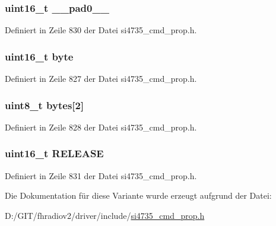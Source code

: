 \subsubsection[{\+\_\+\+\_\+pad0\+\_\+\+\_\+}]{\setlength{\rightskip}{0pt plus 5cm}uint16\+\_\+t \+\_\+\+\_\+pad0\+\_\+\+\_\+}\label{unionfm__agc__rel__rate_a77132c2c26a75f5b8751b235cda23828}


Definiert in Zeile 830 der Datei si4735\+\_\+cmd\+\_\+prop.\+h.

\hypertarget{unionfm__agc__rel__rate_ab0549c1b5ea980a02e7eab77e21fea49}{}
\subsubsection[{byte}]{\setlength{\rightskip}{0pt plus 5cm}uint16\+\_\+t byte}\label{unionfm__agc__rel__rate_ab0549c1b5ea980a02e7eab77e21fea49}


Definiert in Zeile 827 der Datei si4735\+\_\+cmd\+\_\+prop.\+h.

\hypertarget{unionfm__agc__rel__rate_a46e4c05d20a047ec169f60d3167e912e}{}
\subsubsection[{bytes}]{\setlength{\rightskip}{0pt plus 5cm}uint8\+\_\+t bytes\mbox{[}2\mbox{]}}\label{unionfm__agc__rel__rate_a46e4c05d20a047ec169f60d3167e912e}


Definiert in Zeile 828 der Datei si4735\+\_\+cmd\+\_\+prop.\+h.

\hypertarget{unionfm__agc__rel__rate_a11e93d50103a9c890a961d4571dae3b9}{}
\subsubsection[{R\+E\+L\+E\+A\+S\+E}]{\setlength{\rightskip}{0pt plus 5cm}uint16\+\_\+t R\+E\+L\+E\+A\+S\+E}\label{unionfm__agc__rel__rate_a11e93d50103a9c890a961d4571dae3b9}


Definiert in Zeile 831 der Datei si4735\+\_\+cmd\+\_\+prop.\+h.



Die Dokumentation für diese Variante wurde erzeugt aufgrund der Datei\+:\begin{DoxyCompactItemize}
\item 
D\+:/\+G\+I\+T/fhradiov2/driver/include/\hyperlink{si4735__cmd__prop_8h}{si4735\+\_\+cmd\+\_\+prop.\+h}\end{DoxyCompactItemize}
